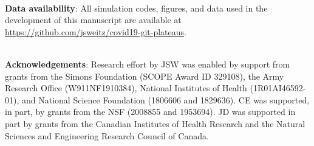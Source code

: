 \mbox{}\\
\noindent
\textbf{Data availability}:
All simulation codes, figures, and data used in the development of this manuscript are available at \url{https://github.com/jsweitz/covid19-git-plateaus}.

\mbox{}\\
\noindent
\textbf{Acknowledgements}:
Research effort by JSW was enabled
by support from grants from the Simons Foundation (SCOPE Award ID 329108), the Army Research 
Office (W911NF1910384), National Institutes of Health (1R01AI46592-01), 
and National Science Foundation (1806606 and 1829636). CE was supported, in part, by grants from the NSF (2008855 and 1953694).  JD was supported in part by 
grants from the Canadian Institutes of Health Research and the Natural Sciences and Engineering Research Council of Canada. 
